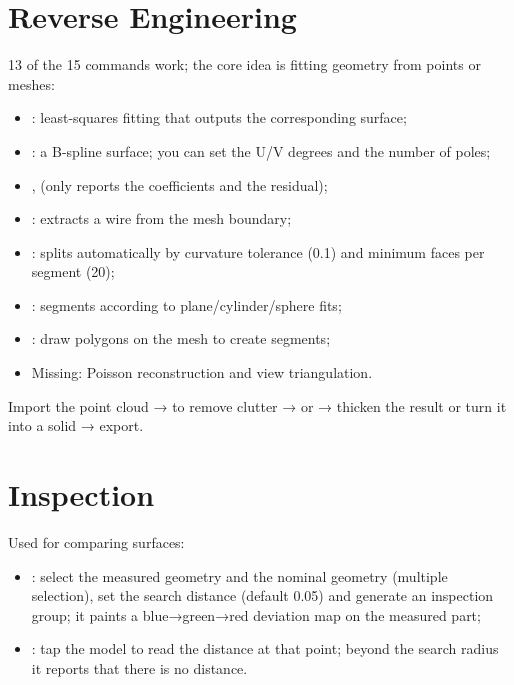 \section{Reverse Engineering}

13 of the 15 commands work; the core idea is fitting geometry from points or meshes:

\begin{itemize}
  \item {}: least-squares fitting that outputs the
        corresponding surface;
  \item {}: a B-spline surface; you can set the U/V degrees and the number of
        poles;
  \item {},  (only reports the coefficients and the
        residual);
  \item {}: extracts a wire from the mesh boundary;
  \item {}: splits automatically by curvature tolerance (0.1) and minimum faces per
        segment (20);
  \item {}: segments according to plane/cylinder/sphere fits;
  \item {}: draw polygons on the mesh to create segments;
  \item Missing: Poisson reconstruction and view triangulation.
\end{itemize}

\begin{practice}
Import the point cloud →  to remove clutter →  or
 → thicken the result or turn it into a solid → export.
\end{practice}

\section{Inspection}

Used for comparing surfaces:

\begin{itemize}
  \item {}: select the measured geometry and the nominal geometry (multiple
        selection), set the search distance (default 0.05) and generate an inspection group; it
        paints a blue→green→red deviation map on the measured part;
  \item {}: tap the model to read the distance at that point; beyond the search radius
        it reports that there is no distance.
\end{itemize}

